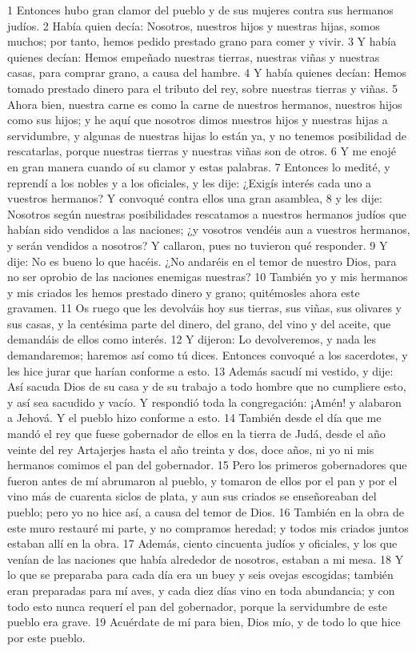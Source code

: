 1 Entonces hubo gran clamor del pueblo y de sus mujeres contra sus hermanos judíos. 
2 Había quien decía: Nosotros, nuestros hijos y nuestras hijas, somos muchos; por tanto, hemos pedido prestado grano para comer y vivir.
3 Y había quienes decían: Hemos empeñado nuestras tierras, nuestras viñas y nuestras casas, para comprar grano, a causa del hambre.
4 Y había quienes decían: Hemos tomado prestado dinero para el tributo del rey, sobre nuestras tierras y viñas.
5 Ahora bien, nuestra carne es como la carne de nuestros hermanos, nuestros hijos como sus hijos; y he aquí que nosotros dimos nuestros hijos y nuestras hijas a servidumbre, y algunas de nuestras hijas lo están ya, y no tenemos posibilidad de rescatarlas, porque nuestras tierras y nuestras viñas son de otros.
6 Y me enojé en gran manera cuando oí su clamor y estas palabras.
7 Entonces lo medité, y reprendí a los nobles y a los oficiales, y les dije: ¿Exigís interés cada uno a vuestros hermanos? Y convoqué contra ellos una gran asamblea,
8 y les dije: Nosotros según nuestras posibilidades rescatamos a nuestros hermanos judíos que habían sido vendidos a las naciones; ¿y vosotros vendéis aun a vuestros hermanos, y serán vendidos a nosotros? Y callaron, pues no tuvieron qué responder.
9 Y dije: No es bueno lo que hacéis. ¿No andaréis en el temor de nuestro Dios, para no ser oprobio de las naciones enemigas nuestras?
10 También yo y mis hermanos y mis criados les hemos prestado dinero y grano; quitémosles ahora este gravamen.
11 Os ruego que les devolváis hoy sus tierras, sus viñas, sus olivares y sus casas, y la centésima parte del dinero, del grano, del vino y del aceite, que demandáis de ellos como interés.
12 Y dijeron: Lo devolveremos, y nada les demandaremos; haremos así como tú dices. Entonces convoqué a los sacerdotes, y les hice jurar que harían conforme a esto.
13 Además sacudí mi vestido, y dije: Así sacuda Dios de su casa y de su trabajo a todo hombre que no cumpliere esto, y así sea sacudido y vacío. Y respondió toda la congregación: ¡Amén! y alabaron a Jehová. Y el pueblo hizo conforme a esto.
14 También desde el día que me mandó el rey que fuese gobernador de ellos en la tierra de Judá, desde el año veinte del rey Artajerjes hasta el año treinta y dos, doce años, ni yo ni mis hermanos comimos el pan del gobernador.
15 Pero los primeros gobernadores que fueron antes de mí abrumaron al pueblo, y tomaron de ellos por el pan y por el vino más de cuarenta siclos de plata,  y aun sus criados se enseñoreaban del pueblo; pero yo no hice así, a causa del temor de Dios.
16 También en la obra de este muro restauré mi parte, y no compramos heredad; y todos mis criados juntos estaban allí en la obra.
17 Además, ciento cincuenta judíos y oficiales, y los que venían de las naciones que había alrededor de nosotros, estaban a mi mesa.
18 Y lo que se preparaba para cada día era un buey y seis ovejas escogidas; también eran preparadas para mí aves, y cada diez días vino en toda abundancia; y con todo esto nunca requerí el pan del gobernador, porque la servidumbre de este pueblo era grave.
19 Acuérdate de mí para bien, Dios mío, y de todo lo que hice por este pueblo.

